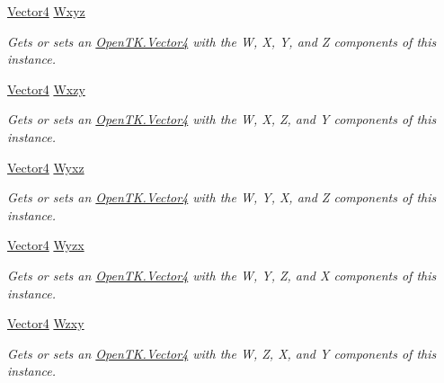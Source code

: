 \begin{DoxyCompactItemize}
\hyperlink{struct_open_t_k_1_1_vector4}{Vector4} \hyperlink{struct_open_t_k_1_1_vector4_ab30f659b21a1510672cd55e801feb81a}{Wxyz}
\begin{DoxyCompactList}\small\item\em Gets or sets an \hyperlink{struct_open_t_k_1_1_vector4}{Open\-T\-K.\-Vector4} with the W, X, Y, and Z components of this instance. \end{DoxyCompactList}\item 
\hyperlink{struct_open_t_k_1_1_vector4}{Vector4} \hyperlink{struct_open_t_k_1_1_vector4_abee347ee58abac0cae1c63acc7f9e45a}{Wxzy}
\begin{DoxyCompactList}\small\item\em Gets or sets an \hyperlink{struct_open_t_k_1_1_vector4}{Open\-T\-K.\-Vector4} with the W, X, Z, and Y components of this instance. \end{DoxyCompactList}\item 
\hyperlink{struct_open_t_k_1_1_vector4}{Vector4} \hyperlink{struct_open_t_k_1_1_vector4_aed53a7c83d8dd97792f074f50df7ac8e}{Wyxz}
\begin{DoxyCompactList}\small\item\em Gets or sets an \hyperlink{struct_open_t_k_1_1_vector4}{Open\-T\-K.\-Vector4} with the W, Y, X, and Z components of this instance. \end{DoxyCompactList}\item 
\hyperlink{struct_open_t_k_1_1_vector4}{Vector4} \hyperlink{struct_open_t_k_1_1_vector4_a0b6a28602302d64606e828a4b20b256b}{Wyzx}
\begin{DoxyCompactList}\small\item\em Gets or sets an \hyperlink{struct_open_t_k_1_1_vector4}{Open\-T\-K.\-Vector4} with the W, Y, Z, and X components of this instance. \end{DoxyCompactList}\item 
\hyperlink{struct_open_t_k_1_1_vector4}{Vector4} \hyperlink{struct_open_t_k_1_1_vector4_ae5568f39cb651a34398fb8e1170c9f22}{Wzxy}
\begin{DoxyCompactList}\small\item\em Gets or sets an \hyperlink{struct_open_t_k_1_1_vector4}{Open\-T\-K.\-Vector4} with the W, Z, X, and Y components of this instance. \end{DoxyCompactList}\item 

\end{DoxyCompactItemize}
